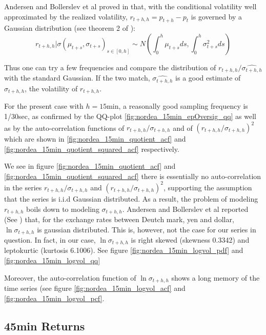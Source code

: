\documentclass{book}
\begin{document}
Andersen and Bollerslev et al proved in \cite{Andersen03} that, with
the conditional volatility well approximated by the realized
volatility, $r_{t+h, h} = p_{t+h} - p_t$ is governed by a Gaussian
distribution (see theorem 2 of \cite{Andersen03}):
\[
r_{t+h, h} | \sigma(\mu_{t+s}, \sigma_{t+s})_{s \in [0, h]} \sim
N(\int_{0}^h \mu_{t+s} ds, \int_{0}^h \sigma_{t+s}^2 ds)
\]

Thus one can try a few frequencies and compare the distribution of
$r_{t+h, h}/\hat{\sigma_{t+h, h}}$ with the standard Gaussian. If the
two match, $\hat{\sigma_{t+h, h}}$ is a good estimate of $\sigma_{t+h,
  h}$, the volatility of $r_{t+h, h}$.

For the present case with $h = 15\text{min}$, a reasonally good
sampling frequency is 1/30sec, as confirmed by the QQ-plot
\ref{fig:nordea_15min_epOversig_qq} as well as by the auto-correlation
functions of $r_{t+h, h} / \sigma_{t+h, h}$ and of $(r_{t+h, h} /
\sigma_{t+h, h})^2$ which are shown in
\ref{fig:nordea_15min_quotient_acf} and
\ref{fig:nordea_15min_quotient_squared_acf} respectively.
\begin{figure}[htb!]
  \centering
\end{figure}

We see in figure \ref{fig:nordea_15min_quotient_acf} and
\ref{fig:nordea_15min_quotient_squared_acf} there is essentially no
auto-correlation in the series $r_{t+h, h} / \sigma_{t+h, h}$ and
$(r_{t+h, h} / \sigma_{t+h, h})^2$, supporting the assumption that the
series is i.i.d Gaussian distributed. As a result, the problem of
modeling $r_{t+h, h}$ boils down to modeling $\sigma_{t+h,
  h}$. Andersen and Bollerslev et al reported (See \cite{Andersen03})
that, for the exchange rates between Deutch mark, yen and dollar, $\ln
\sigma_{t+h, h}$ is gaussian distributed. This is, however, not the
case for our series in question. In fact, in our case, $\ln
\sigma_{t+h, h}$ is right skewed (skewness 0.3342) and leptokurtic
(kurtosis 6.1006). See figure \ref{fig:nordea_15min_logvol_pdf} and
\ref{fig:nordea_15min_logvol_qq}
\begin{figure}[htb!]
  \centering
\end{figure}

Moreover, the auto-correlation function of $\ln\sigma_{t+h, h}$
shows a long memory of the time series (see figure
\ref{fig:nordea_15min_logvol_acf} and
\ref{fig:nordea_15min_logvol_pcf}.

\subsection{45min Returns}




\end{document}
